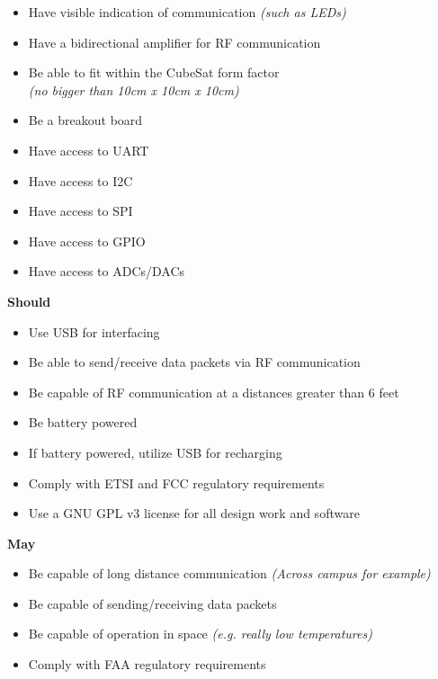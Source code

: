 \documentclass[12pt]{article}
\begin{document}
\begin{description}
\begin{itemize}
			\item{Have visible indication of communication \textit{(such as LEDs)}}
			\item{Have a bidirectional amplifier for RF communication}
			\item{Be able to fit within the CubeSat form factor\\ \textit{(no bigger than 10cm x 10cm x 10cm)}}
			\item{Be a breakout board}
			\item{Have access to UART}
			\item{Have access to I2C}
			\item{Have access to SPI}
			\item{Have access to GPIO}
			\item{Have access to ADCs/DACs}
		\end{itemize}
		\textbf{Should}
		\begin{itemize}
			\item{Use USB for interfacing}
			\item{Be able to send/receive data packets via RF communication}
			\item{Be capable of RF communication at a distances greater than 6 feet}
			\item{Be battery powered}
			\item{If battery powered, utilize USB for recharging}
			\item{Comply with ETSI and FCC regulatory requirements}
			\item{Use a GNU GPL v3 license for all design work and software} 
		\end{itemize}
		\textbf{May}
		\begin{itemize}
			\item{Be capable of long distance communication \textit{(Across campus for example)}}
			\item{Be capable of sending/receiving data packets}
			\item{Be capable of operation in space \textit{(e.g. really low temperatures)}}
			\item{Comply with FAA regulatory requirements}
		\end{itemize}
\end{description}
\end{document}
